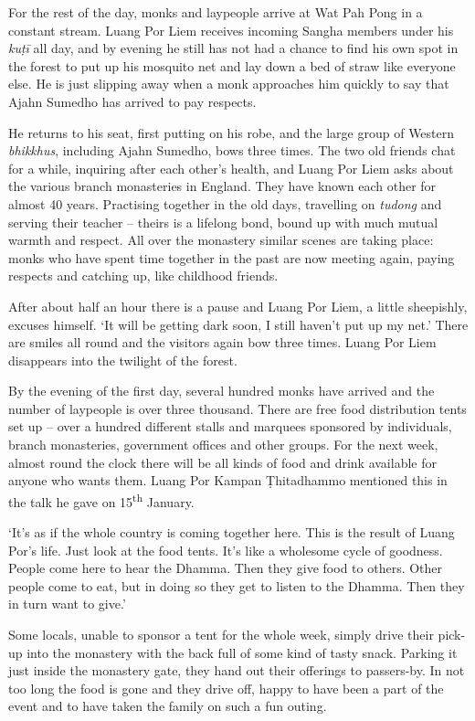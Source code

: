 For the rest of the day, monks and laypeople arrive at Wat Pah Pong in a
constant stream. Luang Por Liem receives incoming Sangha members under
his \emph{kuṭī} all day, and by evening he still has not had a chance to
find his own spot in the forest to put up his mosquito net and lay down
a bed of straw like everyone else. He is just slipping away when a monk
approaches him quickly to say that Ajahn Sumedho has arrived to pay
respects.

He returns to his seat, first putting on his robe, and the large group
of Western \emph{bhikkhus}, including Ajahn Sumedho, bows three times. 
The two old friends chat for a while, inquiring after each other's
health, and Luang Por Liem asks about the various branch monasteries in
England. They have known each other for almost 40 years. Practising
together in the old days, travelling on \emph{tudong} and serving their
teacher -- theirs is a lifelong bond, bound up with much mutual warmth
and respect. All over the monastery similar scenes are taking place: 
monks who have spent time together in the past are now meeting again, 
paying respects and catching up, like childhood friends. 

After about half an hour there is a pause and Luang Por Liem, a little
sheepishly, excuses himself. `It will be getting dark soon, I still
haven't put up my net.' There are smiles all round and the visitors
again bow three times. Luang Por Liem disappears into the twilight of
the forest. 

By the evening of the first day, several hundred monks have arrived and
the number of laypeople is over three thousand. There are free food
distribution tents set up -- over a hundred different stalls and
marquees sponsored by individuals, branch monasteries, government
offices and other groups. For the next week, almost round the clock
there will be all kinds of food and drink available for anyone who wants
them. Luang Por Kampan Ṭhitadhammo mentioned this in the talk he gave on
15\textsuperscript{th} January. 

`It's as if the whole country is coming together here. This is the
result of Luang Por's life. Just look at the food tents. It's like a
wholesome cycle of goodness. People come here to hear the Dhamma. Then
they give food to others. Other people come to eat, but in doing so they
get to listen to the Dhamma. Then they in turn want to give.'

Some locals, unable to sponsor a tent for the whole week, simply drive
their pick-up into the monastery with the back full of some kind of
tasty snack. Parking it just inside the monastery gate, they hand out
their offerings to passers-by. In not too long the food is gone and they
drive off, happy to have been a part of the event and to have taken the
family on such a fun outing. 

